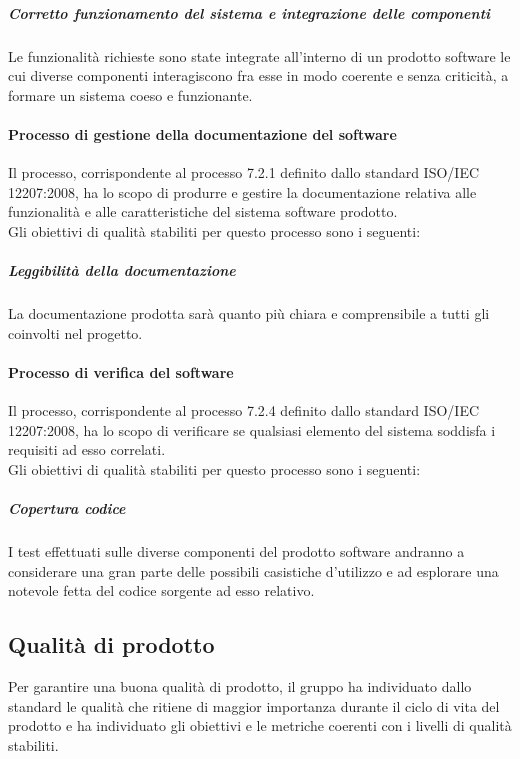 				\subparagraph{Corretto funzionamento del sistema e integrazione delle componenti}
				Le funzionalità richieste sono state integrate all'interno di un prodotto software le cui diverse componenti interagiscono fra esse in modo coerente e senza criticità, a formare un sistema coeso e funzionante.
			\paragraph{Processo di gestione della documentazione del software}
			
			Il processo, corrispondente al processo 7.2.1 definito dallo standard ISO/IEC 12207:2008, ha lo scopo di produrre e gestire la documentazione relativa alle funzionalità e alle caratteristiche del sistema software prodotto.
			\\Gli obiettivi di qualità stabiliti per questo processo sono i seguenti:

				\subparagraph{Leggibilità della documentazione}
				La documentazione prodotta sarà quanto più chiara e comprensibile a tutti gli  coinvolti nel progetto.
			
			\paragraph{Processo di verifica del software}
			
			Il processo, corrispondente al processo 7.2.4 definito dallo standard ISO/IEC 12207:2008, ha lo scopo di verificare se qualsiasi elemento del sistema soddisfa i requisiti ad esso correlati.
			\\Gli obiettivi di qualità stabiliti per questo processo sono i seguenti:

				\subparagraph{Copertura codice}
				I test effettuati sulle diverse componenti del prodotto software andranno a considerare una gran parte delle possibili casistiche d'utilizzo e ad esplorare una notevole fetta del codice sorgente ad esso relativo.
	
	\subsection{Qualità di prodotto}
	Per garantire una buona qualità di prodotto, il gruppo \hx{} ha individuato dallo standard  le qualità che ritiene di maggior importanza durante il ciclo di vita del prodotto e ha individuato gli obiettivi e le metriche coerenti con i livelli di qualità stabiliti.
